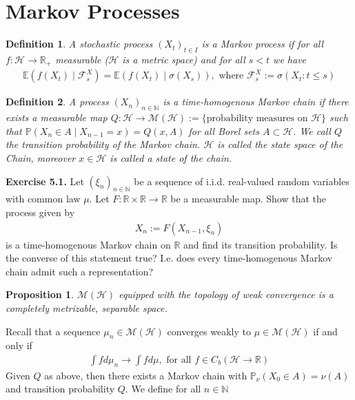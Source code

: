 \documentclass[11pt,a4paper, final]{article}
\newtheorem{prop}{Proposition}[section]
\newtheorem{defn}{Definition}[section]
\theoremstyle{definition}
\begin{document}
\section{Markov Processes}
\begin{defn}
A stochastic process $(X_t)_{t \in I}$ is a Markov process if for all \\ $f: \mathcal{H} \to \mathbb{R}_+$ measurable ($\mathcal{H}$ is a metric space) and for all $s <t$ we have 
\begin{align*}
\mathbb{E}(f(X_t) \mid \mathcal{F}_s^X ) = \mathbb{E}(f (X_t) \mid \sigma (X_s)), \text{ where } \mathcal{F}_s^X := \sigma ( X_t : t \leq s )  
\end{align*}
\end{defn}
\begin{defn} A process $(X_n)_{n \in \mathbb{N}}$ is a time-homogenous Markov chain if there exists a measurable map $Q: \mathcal{H} \to \mathcal{M}( \mathcal{H}):= \lbrace \text{probability measures on } \mathcal{H} \rbrace$ such that $\mathbb{P}(X_n \in A \mid X_{n-1} = x ) = Q(x,A)$ for all Borel sets $A \subset \mathcal{H}$. We call $Q$ the transition probability of the Markov chain. $\mathcal{H}$ is called the state space of the Chain, moreover $x \in \mathcal{H}$ is called a state of the chain. 
\end{defn}
\noindent \textbf{Exercise 5.1.} Let $( \xi_n)_{n \in \mathbb{N}}$ be a sequence of i.i.d. real-valued random variables with common law $\mu$. Let $F: \mathbb{R} \times \mathbb{R} \to \mathbb{R}$ be a measurable map. Show that the process given by 
\begin{align*}
X_n:= F(X_{n-1}, \xi_n)
\end{align*}
is a time-homogenous Markov chain on $\mathbb{R}$ and find its transition probability. Is the converse of this statement true? I.e. does every time-homogenous Markov chain admit such a representation?
\begin{prop} $\mathcal{M}( \mathcal{H})$ equipped with the topology of weak convergence is a completely metrizable, separable space. 
\end{prop}
\noindent Recall that a sequence $\mu_n \in \mathcal{M}( \mathcal{H})$ converges weakly to $\mu \in \mathcal{M}( \mathcal{H})$ if and only if 
\begin{align*}
 \int f d \mu_n \to \int f d \mu, \text{ for all } f \in C_b ( \mathcal{H} \to \mathbb{R})
\end{align*}
\noindent Given $Q$ as above, then there exists a Markov chain with $\mathbb{P}_\nu ( X_0 \in A) = \nu (A)$ and transition probability $Q$. We define for all $n  \in \mathbb{N}$ 
\end{document}
